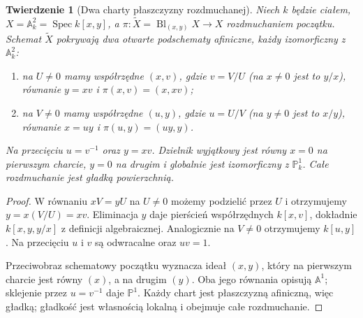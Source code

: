 \documentclass[11pt,a4paper,openany]{report}
\numberwithin{equation}{section}
\theoremstyle{plain}
\newtheorem{twierdzenie}{Twierdzenie}[section]
\theoremstyle{definition}
\theoremstyle{remark}
\newcommand{\A}{\mathbb A}
\newcommand{\PP}{\mathbb P}
\newcommand{\Spec}{\operatorname{Spec}}
\begin{document}
\begin{twierdzenie}[Dwa charty płaszczyzny rozdmuchanej]
\label{tw:ga5-plane-charts}
Niech $k$ będzie ciałem, $X=\A^2_k=\Spec k[x,y]$,
a $\pi:\widetilde X=\operatorname{Bl}_{(x,y)}X\to X$
rozdmuchaniem początku. Schemat $\widetilde X$ pokrywają
dwa otwarte podschematy afiniczne, każdy izomorficzny z
$\A^2_k$:
\begin{enumerate}[label=(\roman*)]
\item na $U\ne0$ mamy współrzędne $(x,v)$, gdzie
$v=V/U$ (na $x\ne0$ jest to $y/x$), równanie $y=xv$ i
$\pi(x,v)=(x,xv)$;
\item na $V\ne0$ mamy współrzędne $(u,y)$, gdzie
$u=U/V$ (na $y\ne0$ jest to $x/y$), równanie $x=uy$ i
$\pi(u,y)=(uy,y)$.
\end{enumerate}
Na przecięciu $u=v^{-1}$ oraz $y=xv$.
Dzielnik wyjątkowy jest równy $x=0$ na pierwszym
charcie, $y=0$ na drugim i globalnie jest izomorficzny
z $\PP^1_k$. Całe rozdmuchanie jest gładką powierzchnią.
\end{twierdzenie}
\begin{proof}
W równaniu $xV=yU$ na $U\ne0$ możemy podzielić przez
$U$ i otrzymujemy $y=x(V/U)=xv$. Eliminacja $y$
daje pierścień współrzędnych $k[x,v]$, dokładnie
$k[x,y,y/x]$ z definicji algebraicznej. Analogicznie
na $V\ne0$ otrzymujemy $k[u,y]$. Na przecięciu
$u$ i $v$ są odwracalne oraz $uv=1$.

Przeciwobraz schematowy początku wyznacza ideał
$(x,y)$, który na pierwszym charcie jest równy $(x)$,
a na drugim $(y)$. Oba jego równania opisują
$\A^1$; sklejenie przez $u=v^{-1}$ daje $\PP^1$.
Każdy chart jest płaszczyzną afiniczną, więc gładką;
gładkość jest własnością lokalną i obejmuje całe
rozdmuchanie.
\end{proof}
\end{document}
